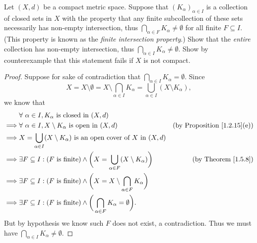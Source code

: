 \begin{exercise}\label{ex 1.5.15}
    Let \((X, d)\) be a compact metric space.
    Suppose that \((K_{\alpha})_{\alpha \in I}\) is a collection of closed sets in \(X\) with the property that any finite subcollection of these sets necessarily has non-empty intersection, thus \(\bigcap_{\alpha \in F} K_{\alpha} \neq \emptyset\) for all finite \(F \subseteq I\).
    (This property is known as the \emph{finite intersection property}.)
    Show that the \emph{entire} collection has non-empty intersection, thus \(\bigcap_{\alpha \in I} K_{\alpha} \neq \emptyset\).
    Show by counterexample that this statement fails if \(X\) is not compact.
\end{exercise}

\begin{proof}
    Suppose for sake of contradiction that \(\bigcap_{\alpha \in I} K_\alpha = \emptyset\).
    Since
    \[
        X = X \setminus \emptyset = X \setminus \bigcap_{\alpha \in I} K_\alpha = \bigcup_{\alpha \in I} (X \setminus K_\alpha),
    \]
    we know that
    \begin{align*}
                 & \forall\ \alpha \in I, K_\alpha \text{ is closed in } (X, d)                                                                                                \\
        \implies & \forall\ \alpha \in I, X \setminus K_\alpha \text{ is open in } (X, d)                                            & \text{(by Proposition \ref{1.2.15}(e))} \\
        \implies & X = \bigcup_{\alpha \in I} (X \setminus K_\alpha) \text{ is an open cover of } X \text{ in } (X, d)                                                         \\
        \implies & \exists F \subseteq I : (F \text{ is finite}) \land \bigg(X = \bigcup_{\alpha \in F} (X \setminus K_\alpha)\bigg) & \text{(by Theorem \ref{1.5.8})}         \\
        \implies & \exists F \subseteq I : (F \text{ is finite}) \land \bigg(X = X \setminus \bigcap_{\alpha \in F} K_\alpha\bigg)                                             \\
        \implies & \exists F \subseteq I : (F \text{ is finite}) \land \bigg(\bigcap_{\alpha \in F} K_\alpha = \emptyset\bigg).
    \end{align*}
    But by hypothesis we know such \(F\) does not exist, a contradiction.
    Thus we must have \(\bigcap_{\alpha \in I} K_\alpha \neq \emptyset\).


\end{proof}
